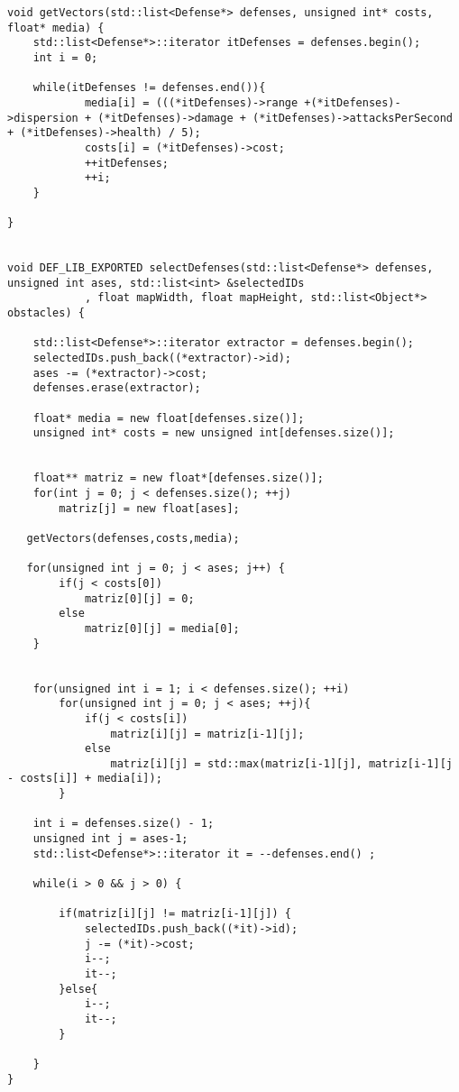 \begin{lstlisting}
void getVectors(std::list<Defense*> defenses, unsigned int* costs, float* media) {
	std::list<Defense*>::iterator itDefenses = defenses.begin();
	int i = 0;

	while(itDefenses != defenses.end()){
			media[i] = (((*itDefenses)->range +(*itDefenses)->dispersion + (*itDefenses)->damage + (*itDefenses)->attacksPerSecond + (*itDefenses)->health) / 5);
			costs[i] = (*itDefenses)->cost;
			++itDefenses;
			++i;
	}
	
}


void DEF_LIB_EXPORTED selectDefenses(std::list<Defense*> defenses, unsigned int ases, std::list<int> &selectedIDs
            , float mapWidth, float mapHeight, std::list<Object*> obstacles) {
	
	std::list<Defense*>::iterator extractor = defenses.begin();
    selectedIDs.push_back((*extractor)->id);
    ases -= (*extractor)->cost;
    defenses.erase(extractor);
	
	float* media = new float[defenses.size()];
	unsigned int* costs = new unsigned int[defenses.size()];
	
	
    float** matriz = new float*[defenses.size()];
    for(int j = 0; j < defenses.size(); ++j)
    	matriz[j] = new float[ases];
   
   getVectors(defenses,costs,media);
   
   for(unsigned int j = 0; j < ases; j++) {
   		if(j < costs[0])
   			matriz[0][j] = 0;		
   		else
   			matriz[0][j] = media[0];
   	}
   	
   
	for(unsigned int i = 1; i < defenses.size(); ++i)
		for(unsigned int j = 0; j < ases; ++j){
			if(j < costs[i])
				matriz[i][j] = matriz[i-1][j];
			else
				matriz[i][j] = std::max(matriz[i-1][j], matriz[i-1][j - costs[i]] + media[i]);
		}	
	
	int i = defenses.size() - 1;
	unsigned int j = ases-1;
    std::list<Defense*>::iterator it = --defenses.end() ;
   
    while(i > 0 && j > 0) {

        if(matriz[i][j] != matriz[i-1][j]) {
            selectedIDs.push_back((*it)->id);
            j -= (*it)->cost;
            i--;
            it--; 
        }else{
            i--;
            it--;
        }
      
    }    
}
\end{lstlisting}
